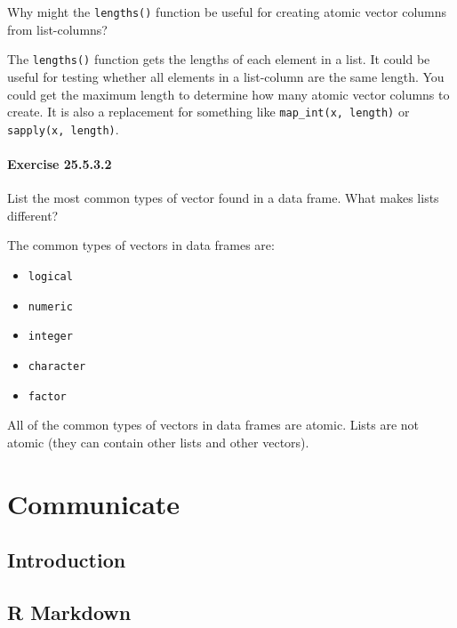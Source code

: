\documentclass[]{book}
\providecommand{\tightlist}{%
  \setlength{\itemsep}{0pt}\setlength{\parskip}{0pt}}
\theoremstyle{plain}
\theoremstyle{remark}
\begin{document}
Why might the \texttt{lengths()} function be useful for creating atomic
vector columns from list-columns?

The \texttt{lengths()} function gets the lengths of each element in a
list. It could be useful for testing whether all elements in a
list-column are the same length. You could get the maximum length to
determine how many atomic vector columns to create. It is also a
replacement for something like \texttt{map\_int(x,\ length)} or
\texttt{sapply(x,\ length)}.

\hypertarget{exercise-25.5.3.2}{%
\subsection*{\texorpdfstring{Exercise
{25.5.3.2}}{Exercise 25.5.3.2}}\label{exercise-25.5.3.2}}

List the most common types of vector found in a data frame. What makes
lists different?

The common types of vectors in data frames are:

\begin{itemize}
\tightlist
\item
  \texttt{logical}
\item
  \texttt{numeric}
\item
  \texttt{integer}
\item
  \texttt{character}
\item
  \texttt{factor}
\end{itemize}

All of the common types of vectors in data frames are atomic. Lists are
not atomic (they can contain other lists and other vectors).

\hypertarget{part-communicate}{%
\part{Communicate}\label{part-communicate}}

\hypertarget{communicate-intro}{%
\chapter{Introduction}\label{communicate-intro}}

\hypertarget{r-markdown}{%
\chapter{R Markdown}\label{r-markdown}}
\end{document}
